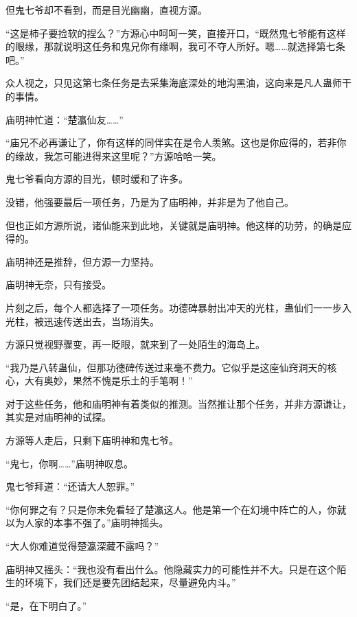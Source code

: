 \begin{this_body}
但鬼七爷却不看到，而是目光幽幽，直视方源。

“这是柿子要捡软的捏么？”方源心中呵呵一笑，直接开口，“既然鬼七爷能有这样的眼缘，那就说明这任务和鬼兄你有缘啊，我可不夺人所好。嗯……就选择第七条吧。”

众人视之，只见这第七条任务是去采集海底深处的地沟黑油，这向来是凡人蛊师干的事情。

庙明神忙道：“楚瀛仙友……”

“庙兄不必再谦让了，你有这样的同伴实在是令人羡煞。这也是你应得的，若非你的缘故，我怎可能进得来这里呢？”方源哈哈一笑。

鬼七爷看向方源的目光，顿时缓和了许多。

没错，他强要最后一项任务，乃是为了庙明神，并非是为了他自己。

但也正如方源所说，诸仙能来到此地，关键就是庙明神。他这样的功劳，的确是应得的。

庙明神还是推辞，但方源一力坚持。

庙明神无奈，只有接受。

片刻之后，每个人都选择了一项任务。功德碑暴射出冲天的光柱，蛊仙们一一步入光柱，被迅速传送出去，当场消失。

方源只觉视野骤变，再一眨眼，就来到了一处陌生的海岛上。

“我乃是八转蛊仙，但那功德碑传送过来毫不费力。它似乎是这座仙窍洞天的核心，大有奥妙，果然不愧是乐土的手笔啊！”

对于这些任务，他和庙明神有着类似的推测。当然推让那个任务，并非方源谦让，其实是对庙明神的试探。

方源等人走后，只剩下庙明神和鬼七爷。

“鬼七，你啊……”庙明神叹息。

鬼七爷拜道：“还请大人恕罪。”

“你何罪之有？只是你未免看轻了楚瀛这人。他是第一个在幻境中阵亡的人，你就以为人家的本事不强了。”庙明神摇头。

“大人你难道觉得楚瀛深藏不露吗？”

庙明神又摇头：“我也没有看出什么。他隐藏实力的可能性并不大。只是在这个陌生的环境下，我们还是要先团结起来，尽量避免内斗。”

“是，在下明白了。”

\end{this_body}

